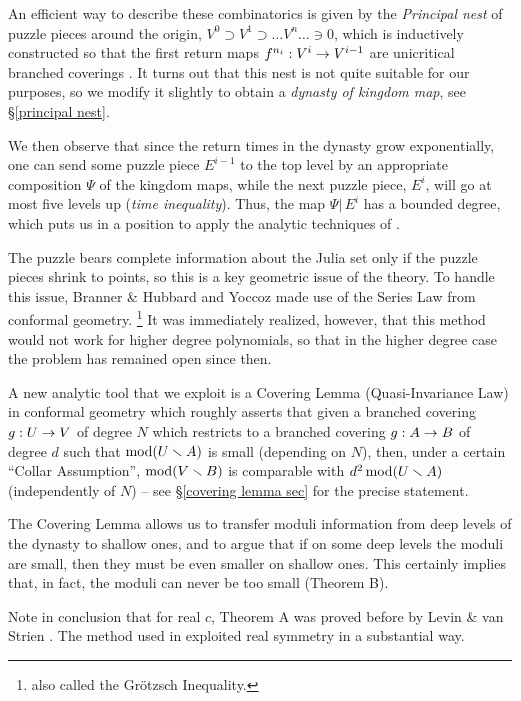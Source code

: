 An efficient way to describe these combinatorics is given by
the {\it Principal nest} of puzzle pieces around the origin,
$V^0\supset V^1\supset\dots V^n\dots\ni 0$, which is inductively constructed so that 
the first return maps $f^{n_i}: V^{i}\rightarrow V^{i-1}$ are unicritical branched coverings
 \cite{puzzle}. 
It turns out that this nest is not quite suitable for our purposes, 
so we modify it slightly to obtain  
a {\it dynasty of kingdom map}, see \S \ref{principal nest}. 

We then observe that since the return times in the dynasty grow exponentially,
one can send some puzzle piece $E^{i-1}$ 
to the top level by an appropriate composition $\Psi$ of the kingdom maps, 
while the next puzzle piece, $E^i$, will go at most five levels up ({\it time inequality}).
Thus, the map $\Psi|\, E^i$ has a bounded degree, which 
puts us in a position to apply the analytic techniques of \cite{covering lemma}.
 
The puzzle bears  complete information about the Julia set only if
the puzzle pieces shrink to points, so this is a key geometric issue of the theory.
To handle this issue,  Branner \& Hubbard and Yoccoz made use of the 
Series Law from conformal geometry.%
\footnote{also called  the   Gr\"otzsch Inequality.}
It was immediately realized, however, that this method would not work for higher degree polynomials,
so that in the higher degree case the problem has remained open since then.

A new analytic tool that we exploit is a Covering Lemma (Quasi-Invariance Law) in conformal geometry \cite{covering lemma}
which roughly asserts that given a branched covering $g: U\rightarrow V$ of degree $N$ which restricts to a branched covering
$g: A\rightarrow B$ of degree $d$ such that $\operatorname{mod} (U\smallsetminus A) $ is small (depending on $N$), 
then, under a certain ``Collar Assumption'',  $ \operatorname{mod}(V\smallsetminus B)$  is  comparable with  $d^2 \operatorname{mod}(U\smallsetminus A)$  
(independently of $N$) -- see \S \ref{covering lemma sec} for the precise statement.    

The Covering Lemma allows us to transfer moduli information from deep levels of the dynasty to 
shallow ones, and to argue that if on some deep levels the moduli are small, then they must be even 
smaller on  shallow ones. This certainly implies that, in fact, the moduli can never  be too small (Theorem B).

\ssk
Note in conclusion that
for real $c$, Theorem A  was proved before by Levin \& van Strien \cite{LS}.
The method  used in \cite{LS} exploited real symmetry in a substantial way. 

